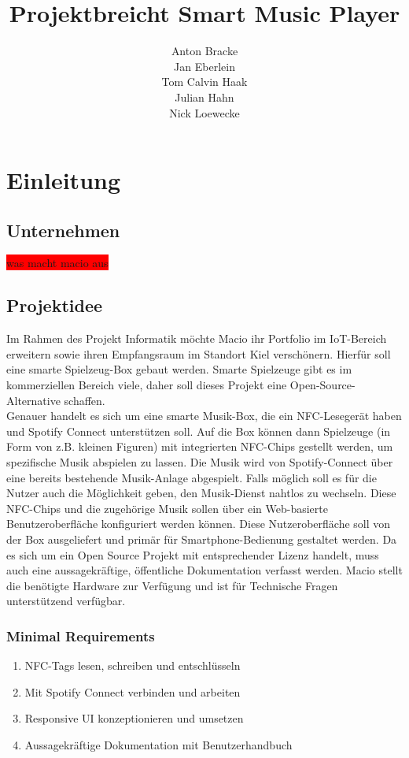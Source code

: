 \documentclass[10pt, a4paper, draft]{article}
\title{Projektbreicht Smart Music Player}
\author{Anton Bracke\\Jan Eberlein\\Tom Calvin Haak\\Julian Hahn\\Nick Loewecke}
\begin{document}
\maketitle
\tableofcontents

\section{Einleitung}
\subsection{Unternehmen}
\colorbox{red}{was macht macio aus}
\subsection{Projektidee}
Im Rahmen des Projekt Informatik möchte Macio ihr Portfolio im IoT-Bereich erweitern sowie ihren Empfangsraum im Standort Kiel verschönern.
Hierfür soll eine smarte Spielzeug-Box gebaut werden.
Smarte Spielzeuge gibt es im kommerziellen Bereich viele, daher soll dieses Projekt eine Open-Source-Alternative schaffen.\\
Genauer handelt es sich um eine smarte Musik-Box, die ein NFC-Lesegerät haben und Spotify Connect unterstützen soll.
Auf die Box können dann Spielzeuge (in Form von z.B. kleinen Figuren) mit integrierten NFC-Chips gestellt werden, um spezifische Musik abspielen zu lassen.
Die Musik wird von Spotify-Connect über eine bereits bestehende Musik-Anlage abgespielt.
Falls möglich soll es für die Nutzer auch die Möglichkeit geben, den Musik-Dienst nahtlos zu wechseln.
Diese NFC-Chips und die zugehörige Musik sollen über ein Web-basierte Benutzeroberfläche konfiguriert werden können.
Diese Nutzeroberfläche soll von der Box ausgeliefert und primär für Smartphone-Bedienung gestaltet werden.
Da es sich um ein Open Source Projekt mit entsprechender Lizenz handelt, muss auch eine aussagekräftige, öffentliche Dokumentation verfasst werden.
Macio stellt die benötigte Hardware zur Verfügung und ist für Technische Fragen unterstützend verfügbar.

\subsubsection{Minimal Requirements}
\begin{enumerate}
  \item NFC-Tags lesen, schreiben und entschlüsseln
  \item Mit Spotify Connect verbinden und arbeiten
  \item Responsive UI konzeptionieren und umsetzen
  \item Aussagekräftige Dokumentation mit Benutzerhandbuch
\end{enumerate}
\end{document}
